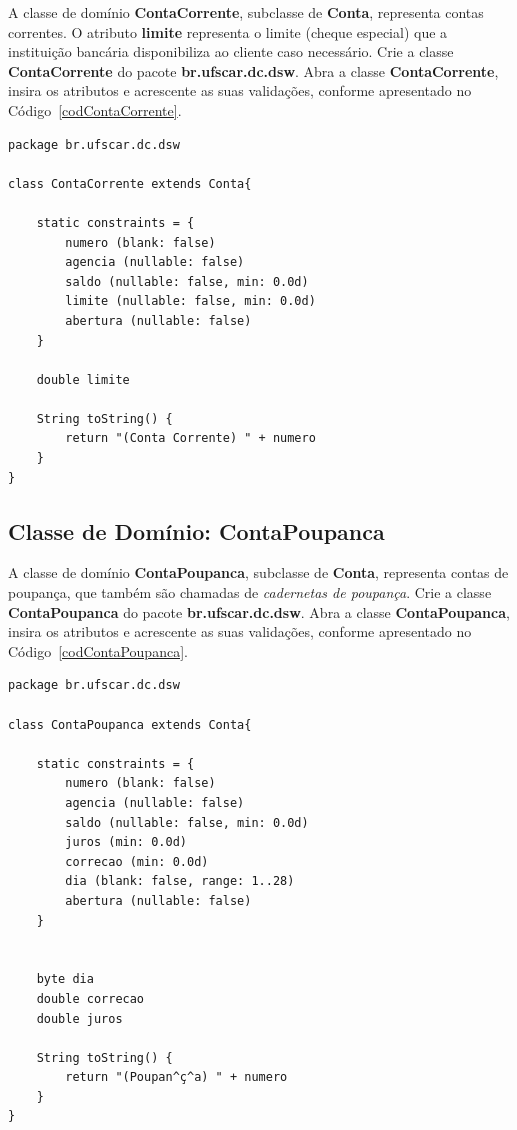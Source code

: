 \vspace{0.5cm}

A classe  de domínio {\bf  ContaCorrente}, subclasse de {\bf  Conta}, representa
contas correntes.  O atributo {\bf limite} representa o limite (cheque especial)
que a  instituição bancária  disponibiliza ao cliente  caso necessário.   Crie a
classe {\bf ContaCorrente} do pacote {\bf br.ufscar.dc.dsw}.  Abra a classe {\bf
  ContaCorrente}, insira os atributos  e acrescente as suas validações, conforme
apresentado no Código~\ref{codContaCorrente}. 

\begin{lstlisting}[caption=Classe de domínio  {\bf ContaCorrente}, frame = trBL,
    float=htbp, label=codContaCorrente] 
package br.ufscar.dc.dsw

class ContaCorrente extends Conta{

    static constraints = {
        numero (blank: false)
        agencia (nullable: false)
        saldo (nullable: false, min: 0.0d)
        limite (nullable: false, min: 0.0d)
        abertura (nullable: false)
    }
    
    double limite
    
    String toString() {
        return "(Conta Corrente) " + numero
    }
}
\end{lstlisting}

\subsection{Classe de Domínio: ContaPoupanca}\label{secContaPoupanca}

\vspace{0.5cm}

A classe  de domínio {\bf  ContaPoupanca}, subclasse de {\bf  Conta}, representa
contas de  poupança, que  também são chamadas  de {\em cadernetas  de poupança}.
Crie  a classe  {\bf ContaPoupanca}  do pacote  {\bf br.ufscar.dc.dsw}.   Abra a
classe {\bf ContaPoupanca}, insira os atributos e acrescente as suas validações,
conforme apresentado no Código~\ref{codContaPoupanca}. 

\begin{lstlisting}[caption=Classe de domínio  {\bf ContaPoupanca}, frame = trBL,
    float=htbp, label=codContaPoupanca] 
package br.ufscar.dc.dsw

class ContaPoupanca extends Conta{

    static constraints = {
        numero (blank: false)
        agencia (nullable: false)
        saldo (nullable: false, min: 0.0d)
        juros (min: 0.0d)
        correcao (min: 0.0d)
        dia (blank: false, range: 1..28)
        abertura (nullable: false)
    }
    
    
    byte dia    
    double correcao
    double juros
    
    String toString() {
        return "(Poupan^ç^a) " + numero
    }
}
\end{lstlisting}

